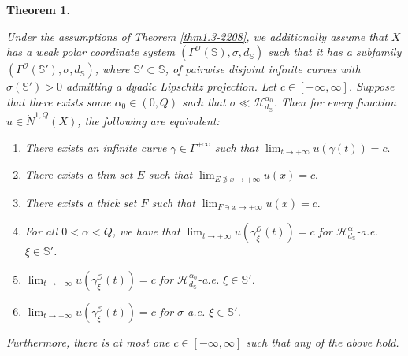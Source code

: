 \documentclass[10pt]{amsart}
\newtheorem{theorem}{Theorem}[section]
\numberwithin{equation}{section}
\newcommand{\Ha}{\mathcal{H}}
\begin{document}
\begin{theorem}\label{thm4-2705}

{
Under the assumptions of Theorem \ref{thm1.3-2208}, we additionally assume that $X$ has a weak polar coordinate system $(\Gamma^{\mathcal O}(\mathbb S), \sigma, d_{\mathbb S})$ such that it has a subfamily $(\Gamma^{\mathcal O}(\mathbb S'), \sigma, d_{\mathbb S})$, where $\mathbb S'\subset\mathbb S$, of pairwise disjoint infinite curves with $\sigma(\mathbb S')>0$ admitting  a dyadic Lipschitz projection. }
Let $c\in[-\infty,\infty]$. Suppose that there exists some $\alpha_0\in (0,Q)$ such that{
$\sigma\ll\Ha^{\alpha_0}_{d_{\mathbb S}}$}.  Then for every function $u\in \dot N^{1,Q}(X)$, the following are equivalent:
\begin{enumerate}
    \item[1.] There exists an infinite curve $\gamma\in\Gamma^{+\infty}$ such that $\lim_{t\to{+\infty}}u(\gamma(t))=c.$
    \item[2.]  There exists a thin set $E$  such that  $\lim_{E\not\ni x\to{+\infty}}u(x)=c.$
    \item[3.]  There exists a thick set $F$  such that 
	$\lim_{F\ni x\to+\infty}u(x)=c.$
    \item[4.] For all $0<\alpha<Q$, we have that $\lim_{t\to{+\infty}} u(\gamma_\xi^{\mathcal O}(t))=c$ 
			for{
			$\mathcal H^{\alpha}_{d_{\mathbb S}}$}-a.e.{
			$\xi\in\mathbb S'$}. 
	\item[5.]$\lim_{t\to{+\infty}} u(\gamma_\xi^{\mathcal O}(t))=c$ for {
	$\Ha^{\alpha_0}_{d_{\mathbb S}}
$}-a.e.{
$\xi\in\mathbb S'$}.		
    \item[6.]  $\lim_{t\to{+\infty}} u(\gamma_\xi^{\mathcal O}(t))=c$ for $\sigma
$-a.e. {
$\xi\in\mathbb S'$}. 
\end{enumerate}
Furthermore, there is at most one $c\in[-\infty,\infty]$ such that any of the above hold.
\end{theorem}

 
\end{document}
